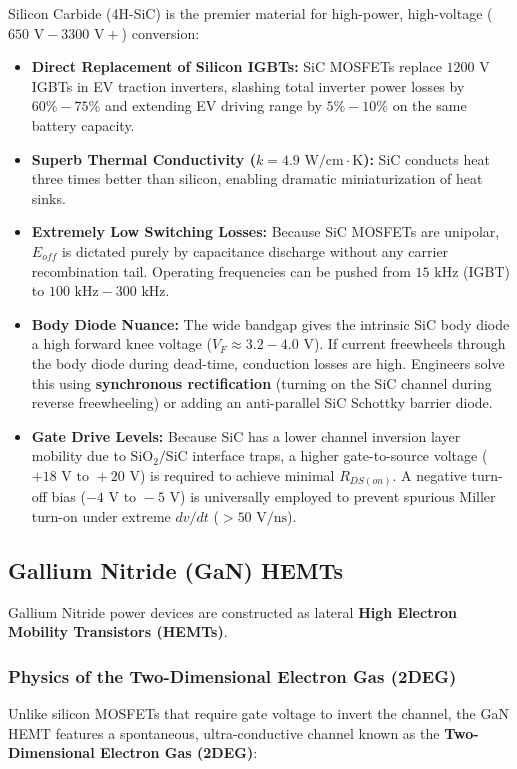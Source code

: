\documentclass[11pt,a4paper]{article}
\begin{document}
Silicon Carbide (4H-SiC) is the premier material for high-power, high-voltage ($650\text{ V} - 3300\text{ V}+$) conversion:
\begin{itemize}[leftmargin=*]
  \item \textbf{Direct Replacement of Silicon IGBTs:} SiC MOSFETs replace $1200\text{ V}$ IGBTs in EV traction inverters, slashing total inverter power losses by $60\% - 75\%$ and extending EV driving range by $5\% - 10\%$ on the same battery capacity.
  \item \textbf{Superb Thermal Conductivity ($k = 4.9\text{ W/cm}\cdot\text{K}$):} SiC conducts heat three times better than silicon, enabling dramatic miniaturization of heat sinks.
  \item \textbf{Extremely Low Switching Losses:} Because SiC MOSFETs are unipolar, $E_{off}$ is dictated purely by capacitance discharge without any carrier recombination tail. Operating frequencies can be pushed from $15\text{ kHz}$ (IGBT) to $100\text{ kHz} - 300\text{ kHz}$.
  \item \textbf{Body Diode Nuance:} The wide bandgap gives the intrinsic SiC body diode a high forward knee voltage ($V_F \approx 3.2 - 4.0\text{ V}$). If current freewheels through the body diode during dead-time, conduction losses are high. Engineers solve this using \textbf{synchronous rectification} (turning on the SiC channel during reverse freewheeling) or adding an anti-parallel SiC Schottky barrier diode.
  \item \textbf{Gate Drive Levels:} Because SiC has a lower channel inversion layer mobility due to $\text{SiO}_2/\text{SiC}$ interface traps, a higher gate-to-source voltage ($+18\text{ V} \text{ to } +20\text{ V}$) is required to achieve minimal $R_{DS(on)}$. A negative turn-off bias ($-4\text{ V} \text{ to } -5\text{ V}$) is universally employed to prevent spurious Miller turn-on under extreme $dv/dt$ ($> 50\text{ V/ns}$).
\end{itemize}

\subsection{Gallium Nitride (GaN) HEMTs}

Gallium Nitride power devices are constructed as lateral \textbf{High Electron Mobility Transistors (HEMTs)}.

\subsubsection{Physics of the Two-Dimensional Electron Gas (2DEG)}
Unlike silicon MOSFETs that require gate voltage to invert the channel, the GaN HEMT features a spontaneous, ultra-conductive channel known as the \textbf{Two-Dimensional Electron Gas (2DEG)}:
\end{document}
